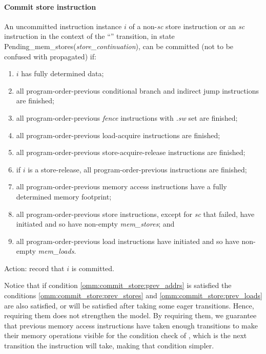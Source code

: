 \paragraph{Commit store instruction}\label{omm:commit_stores}
An uncommitted instruction instance $i$ of a non-{\em sc} store instruction or an {\em sc} instruction in the context of the ``'' transition, in state {\sc Pending\_mem\_stores}({\it store\_continuation}), can be committed (not to be confused with propagated) if:
\begin{enumerate}
\item $i$ has fully determined data;
\item all program-order-previous conditional branch and indirect jump instructions are finished;
\item all program-order-previous {\em fence} instructions with {\em .sw} set are finished;
\item all program-order-previous load-acquire instructions are finished;
\item all program-order-previous store-acquire-release instructions are finished;
\item  if $i$ is a store-release, all program-order-previous instructions are finished;
\item\label{omm:commit_store:prev_addrs} all program-order-previous memory access instructions have a fully determined memory footprint;
\item\label{omm:commit_store:prev_stores} all program-order-previous store instructions, except for {\em sc} that failed, have initiated and so have non-empty {\it mem\_stores}; and
\item\label{omm:commit_store:prev_loads} all program-order-previous load instructions have initiated and so have non-empty {\it mem\_loads}.
\end{enumerate}
Action: record that $i$ is committed.

\begin{commentary}
Notice that if condition \ref{omm:commit_store:prev_addrs} is satisfied the conditions \ref{omm:commit_store:prev_stores} and \ref{omm:commit_store:prev_loads} are also satisfied, or will be satisfied after taking some eager transitions.
Hence, requiring them does not strengthen the model.
By requiring them, we guarantee that previous memory access instructions have taken enough transitions to make their memory operations visible for the condition check of , which is the next transition the instruction will take, making that condition simpler.
\end{commentary}


